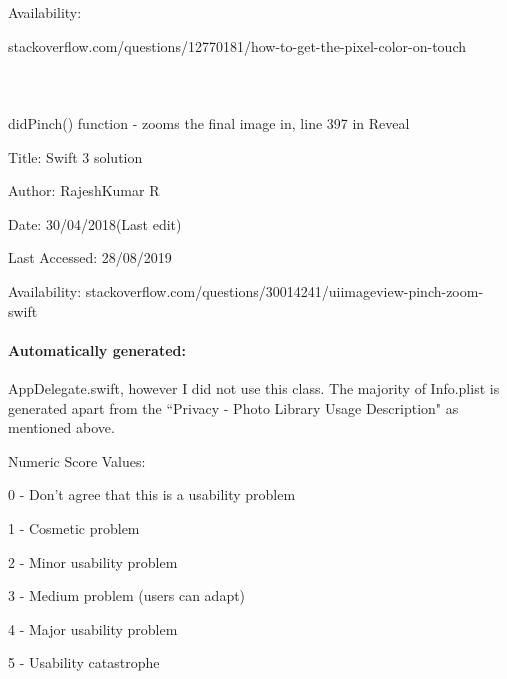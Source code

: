 \documentclass[11pt]{article}
\begin{document}
            Availability:
            
            stackoverflow.com/questions/12770181/how-to-get-the-pixel-color-on-touch
            
            \paragraph{\\}
            
            didPinch() function - zooms the final image in, line 397 in Reveal
            
            Title: Swift 3 solution
            
            Author: RajeshKumar R
            
            Date: 30/04/2018(Last edit)
            
            Last Accessed: 28/08/2019
            
            Availability: stackoverflow.com/questions/30014241/uiimageview-pinch-zoom-swift
            
            \paragraph{Automatically generated:}
            AppDelegate.swift, however I did not use this class. 
            The majority of Info.plist is generated apart from the ``Privacy - Photo Library Usage Description" as mentioned above. 
    
    \newpage
{}
Numeric Score Values:

0 - Don’t agree that this is a usability problem

1 - Cosmetic problem 

2 - Minor usability problem

3 - Medium problem (users can adapt) 

4 - Major usability problem

5 - Usability catastrophe
\end{document}
